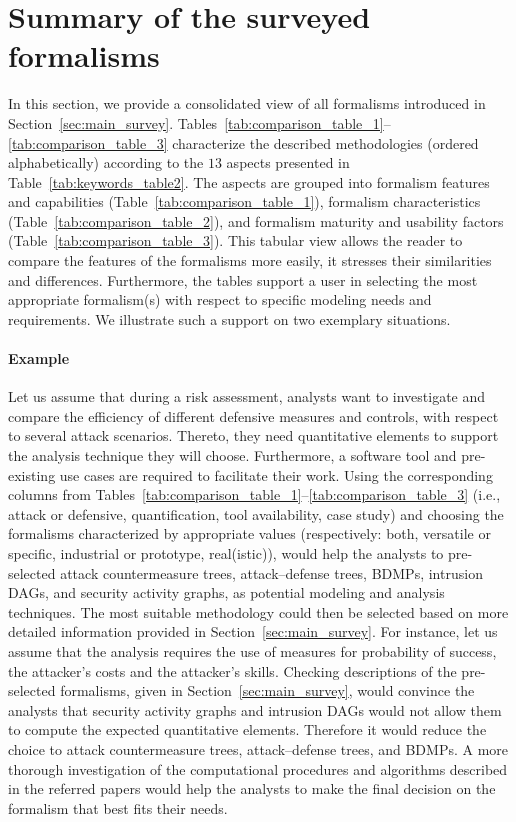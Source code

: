 \documentclass[a4paper]{article}
\begin{document}
\section{Summary of the surveyed formalisms}
\label{sec:table}

In this section, we provide a consolidated view of all formalisms introduced in
Section~\ref{sec:main_survey}.
Tables~\ref{tab:comparison_table_1}--\ref{tab:comparison_table_3} characterize
the described methodologies (ordered alphabetically) according to the $13$ 
aspects presented in Table~\ref{tab:keywords_table2}. The aspects are grouped 
into formalism features and capabilities (Table~\ref{tab:comparison_table_1}),
formalism  characteristics (Table~\ref{tab:comparison_table_2}), and formalism
maturity and usability factors (Table~\ref{tab:comparison_table_3}). This
tabular view allows the reader to compare the features of the formalisms more
easily, it stresses their similarities and differences. Furthermore, the tables
support a user in selecting the most appropriate formalism(s) with respect to
specific modeling needs and requirements. We illustrate such a support on two
exemplary situations. 


\paragraph{Example \theexmpl}

Let us assume that during a risk assessment, analysts want to investigate and
compare the efficiency of different defensive measures and controls, with
respect to several attack scenarios. Thereto, they need quantitative elements to
support the analysis technique they will choose. Furthermore, a software tool
and pre-existing use cases are required to facilitate their work. Using the
corresponding columns from 
Tables~\ref{tab:comparison_table_1}--\ref{tab:comparison_table_3} (i.e., attack 
or defensive, quantification, tool availability, case study) and choosing the
formalisms characterized by appropriate values (respectively: both, versatile or
specific, industrial or prototype, real(istic)), would help the analysts to
pre-selected attack countermeasure trees, attack--defense trees, BDMPs, 
intrusion DAGs, and security activity graphs, as potential modeling and analysis
techniques. The most suitable methodology could then be selected based on more
detailed information provided in Section~\ref{sec:main_survey}. For instance,
let us assume that the analysis requires the use of measures for probability of
success, the attacker's costs and the attacker's skills. Checking descriptions
of the pre-selected formalisms, given in Section~\ref{sec:main_survey}, would
convince the analysts that security activity graphs and intrusion DAGs would not
allow them to compute the expected quantitative elements. Therefore it would
reduce the choice to attack countermeasure trees, attack--defense trees, and
BDMPs. A more thorough investigation of the computational procedures and
algorithms described in the referred papers would help the analysts to make the
final decision on the formalism that best fits their needs. 
\end{document}
